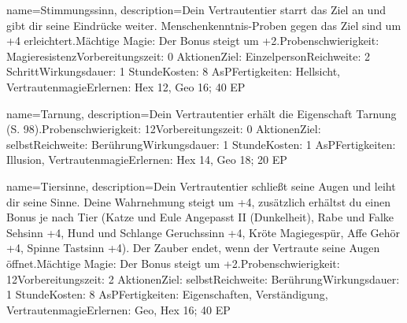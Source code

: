 {
    name={Stimmungssinn},
    description={Dein Vertrautentier starrt das Ziel an und gibt dir seine Eindrücke weiter. Menschenkenntnis-Proben gegen das Ziel sind um +4 erleichtert.\newline Mächtige Magie: Der Bonus steigt um +2.\newline Probenschwierigkeit: Magieresistenz\newline Vorbereitungszeit: 0 Aktionen\newline Ziel: Einzelperson\newline Reichweite: 2 Schritt\newline Wirkungsdauer: 1 Stunde\newline Kosten: 8 AsP\newline Fertigkeiten: Hellsicht, Vertrautenmagie\newline Erlernen: Hex 12, Geo 16; 40 EP}
}


{
    name={Tarnung},
    description={Dein Vertrautentier erhält die Eigenschaft Tarnung (S. 98).\newline Probenschwierigkeit: 12\newline Vorbereitungszeit: 0 Aktionen\newline Ziel: selbst\newline Reichweite: Berührung\newline Wirkungsdauer: 1 Stunde\newline Kosten: 1 AsP\newline Fertigkeiten: Illusion, Vertrautenmagie\newline Erlernen: Hex 14, Geo 18; 20 EP}
}


{
    name={Tiersinne},
    description={Dein Vertrautentier schließt seine Augen und leiht dir seine Sinne. Deine Wahrnehmung steigt um +4, zusätzlich erhältst du einen Bonus je nach Tier (Katze und Eule  Angepasst II (Dunkelheit), Rabe und Falke Sehsinn +4, Hund und Schlange Geruchssinn +4, Kröte Magiegespür, Affe Gehör +4, Spinne Tastsinn +4). Der Zauber endet, wenn der Vertraute seine Augen öffnet.\newline Mächtige Magie: Der Bonus steigt um +2.\newline Probenschwierigkeit: 12\newline Vorbereitungszeit: 2 Aktionen\newline Ziel: selbst\newline Reichweite: Berührung\newline Wirkungsdauer: 1 Stunde\newline Kosten: 8 AsP\newline Fertigkeiten: Eigenschaften, Verständigung, Vertrautenmagie\newline Erlernen: Geo, Hex 16; 40 EP}
}


